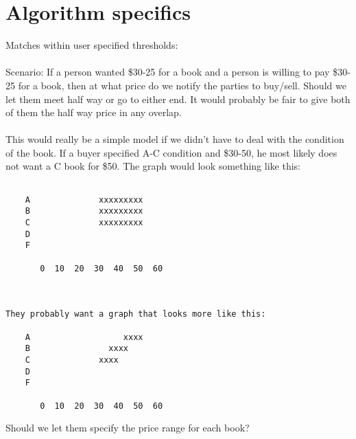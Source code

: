 \section{Algorithm specifics}

Matches within user specified thresholds:\\
\\
Scenario:  If a person wanted \$30-25 for a book and a person is willing to pay
\$30-25 for a book, then at what price do we notify the parties to buy/sell.
Should we let them meet half way or go to either end.  It would probably be
fair to give both of them the half way price in any overlap.\\
\\
This would really be a simple model if we didn't have to deal with the
condition of the book.  If a buyer specified A-C condition and \$30-50, he
most likely does not want a C book for \$50.  The graph would look something
like this:\\

\begin{verbatim}

	A              xxxxxxxxx
	B      	       xxxxxxxxx
	C              xxxxxxxxx
	D
	F

	   0  10  20  30  40  50  60



They probably want a graph that looks more like this:

	A                   xxxx
	B      	         xxxx
	C              xxxx
	D
	F

	   0  10  20  30  40  50  60

\end{verbatim}


Should we let them specify the price range for each book?\\


